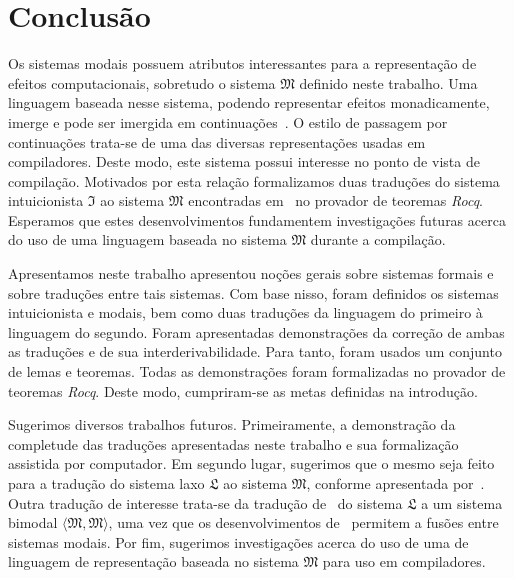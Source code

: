 \chapter{Conclusão}
    Os sistemas modais possuem atributos interessantes para a representação de efeitos computacionais, sobretudo o sistema $\mathfrak{M}$ definido neste trabalho.
    Uma linguagem baseada nesse sistema, podendo representar efeitos monadicamente, imerge e pode ser imergida em continuações~\citep{Filinski.1994}.
    O estilo de passagem por continuações trata-se de uma das diversas representações usadas em compiladores.
    Deste modo, este sistema possui interesse no ponto de vista de compilação.
    Motivados por esta relação formalizamos duas traduções do sistema intuicionista $\mathfrak{I}$ ao sistema $\mathfrak{M}$ encontradas em~\cite{Troelstra+Schwichtenberg.2000} no provador de teoremas \emph{Rocq}.
    Esperamos que estes desenvolvimentos fundamentem investigações futuras acerca do uso de uma linguagem baseada no sistema $\mathfrak{M}$ durante a compilação.

    \vspace{.5\baselineskip}
    Apresentamos neste trabalho apresentou noções gerais sobre sistemas formais e sobre traduções entre tais sistemas.
    Com base nisso, foram definidos os sistemas intuicionista e modais, bem como duas traduções da linguagem do primeiro à linguagem do segundo.
    Foram apresentadas demonstrações da correção de ambas as traduções e de sua interderivabilidade.
    Para tanto, foram usados um conjunto de lemas e teoremas.
    Todas as demonstrações foram formalizadas no provador de teoremas \emph{Rocq}.
    Deste modo, cumpriram-se as metas definidas na introdução.

    \vspace{.5\baselineskip}
    Sugerimos diversos trabalhos futuros. Primeiramente, a demonstração da completude das traduções apresentadas neste trabalho e sua formalização assistida por computador.
    Em segundo lugar, sugerimos que o mesmo seja feito para a tradução do sistema laxo $\mathfrak{L}$ ao sistema $\mathfrak{M}$, conforme apresentada por~\cite{Pfenning+Davies.2001}. 
    Outra tradução de interesse trata-se da tradução de~\cite{Fairtlough+Mendler.1997} do sistema $\mathfrak{L}$ a um sistema bimodal $\langle\mathfrak{M},\mathfrak{M}\rangle$, uma vez que os desenvolvimentos de~\cite{Nunes+Roggia+Torrens.2025} permitem a fusões entre sistemas modais.
    Por fim, sugerimos investigações acerca do uso de uma de linguagem de representação baseada no sistema $\mathfrak{M}$ para uso em compiladores.

